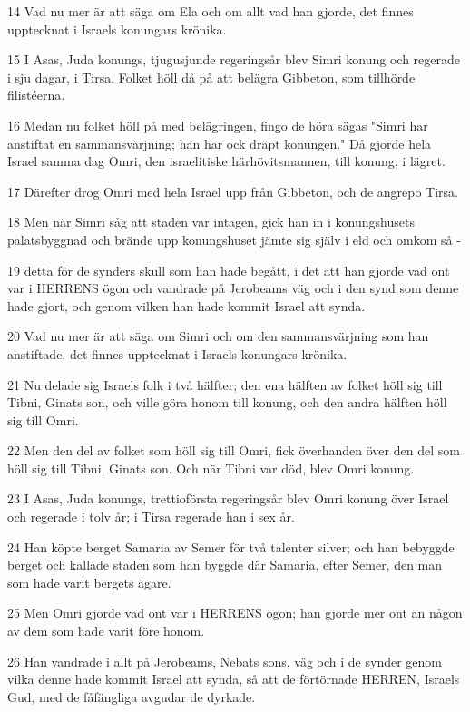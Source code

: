 \par 14 Vad nu mer är att säga om Ela och om allt vad han gjorde, det finnes upptecknat i Israels konungars krönika.
\par 15 I Asas, Juda konungs, tjugusjunde regeringsår blev Simri konung och regerade i sju dagar, i Tirsa. Folket höll då på att belägra Gibbeton, som tillhörde filistéerna.
\par 16 Medan nu folket höll på med belägringen, fingo de höra sägas "Simri har anstiftat en sammansvärjning; han har ock dräpt konungen." Då gjorde hela Israel samma dag Omri, den israelitiske härhövitsmannen, till konung, i lägret.
\par 17 Därefter drog Omri med hela Israel upp från Gibbeton, och de angrepo Tirsa.
\par 18 Men när Simri såg att staden var intagen, gick han in i konungshusets palatsbyggnad och brände upp konungshuset jämte sig själv i eld och omkom så -
\par 19 detta för de synders skull som han hade begått, i det att han gjorde vad ont var i HERRENS ögon och vandrade på Jerobeams väg och i den synd som denne hade gjort, och genom vilken han hade kommit Israel att synda.
\par 20 Vad nu mer är att säga om Simri och om den sammansvärjning som han anstiftade, det finnes upptecknat i Israels konungars krönika.
\par 21 Nu delade sig Israels folk i två hälfter; den ena hälften av folket höll sig till Tibni, Ginats son, och ville göra honom till konung, och den andra hälften höll sig till Omri.
\par 22 Men den del av folket som höll sig till Omri, fick överhanden över den del som höll sig till Tibni, Ginats son. Och när Tibni var död, blev Omri konung.
\par 23 I Asas, Juda konungs, trettioförsta regeringsår blev Omri konung över Israel och regerade i tolv år; i Tirsa regerade han i sex år.
\par 24 Han köpte berget Samaria av Semer för två talenter silver; och han bebyggde berget och kallade staden som han byggde där Samaria, efter Semer, den man som hade varit bergets ägare.
\par 25 Men Omri gjorde vad ont var i HERRENS ögon; han gjorde mer ont än någon av dem som hade varit före honom.
\par 26 Han vandrade i allt på Jerobeams, Nebats sons, väg och i de synder genom vilka denne hade kommit Israel att synda, så att de förtörnade HERREN, Israels Gud, med de fåfängliga avgudar de dyrkade.

